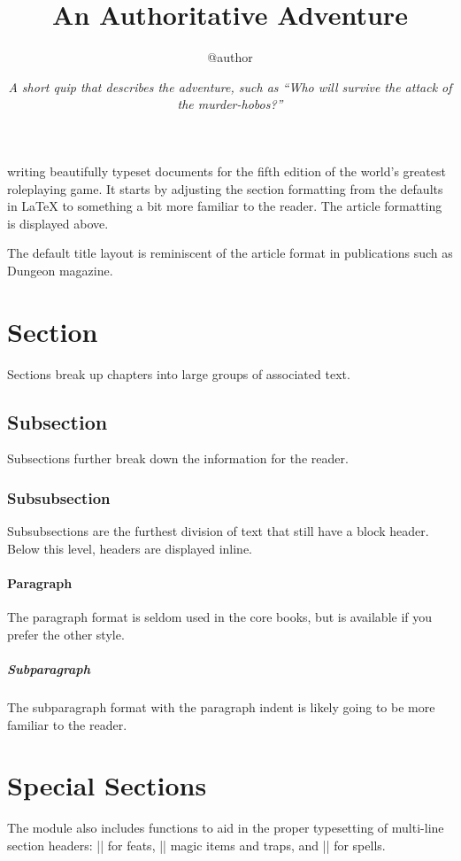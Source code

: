 \documentclass[letterpaper,twocolumn,openany]{dndarticle}
\title{An Authoritative Adventure}
\author{@author}
\date{{\quipfont \small\textit{A short quip that describes the adventure, such as ``Who will survive the attack of the murder-hobos?''}}}
\begin{document}
{
	\hypersetup{hidelinks}
}

\maketitle

 writing beautifully typeset documents for the fifth edition of the world's greatest roleplaying game. It starts by adjusting the section formatting from the defaults in \LaTeX{} to something a bit more familiar to the reader. The article formatting is displayed above.

The default title layout is reminiscent of the article format in publications such as Dungeon magazine.

\section{Section}
Sections break up chapters into large groups of associated text.

\subsection{Subsection}
Subsections further break down the information for the reader.

\subsubsection{Subsubsection}
Subsubsections are the furthest division of text that still have a block header. Below this level, headers are displayed inline.

\paragraph{Paragraph}
The paragraph format is seldom used in the core books, but is available if you prefer the other style.

\subparagraph{Subparagraph}
The subparagraph format with the paragraph indent is likely going to be more familiar to the reader.

\section{Special Sections}
The module also includes functions to aid in the proper typesetting of multi-line section headers: |\DndFeatHeader| for feats, |\DndItemHeader| magic items and traps, and |\DndSpellHeader| for spells.
\end{document}
